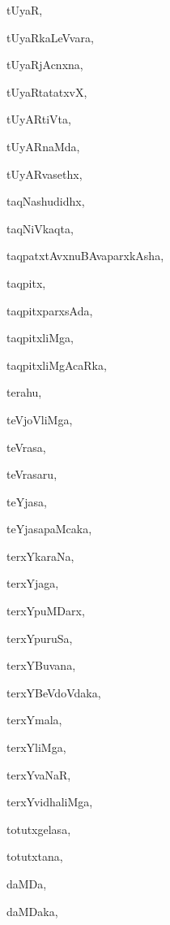 \begin{multicols}{2}
{tUyaR}, \pageref{tUyaR}

{tUyaRkaLeVvara}, \pageref{tUyaRkaLeVvara}

{tUyaRjAcnxna}, \pageref{tUyaRjAcnxna}

{tUyaRtatatxvX}, \pageref{tUyaRtatatxvX}

{tUyARtiVta}, \pageref{tUyARtiVta}

{tUyARnaMda}, \pageref{tUyARnaMda}

{tUyARvasethx}, \pageref{tUyARvasethx}

{taqNashudidhx}, \pageref{taqNashudidhx}

{taqNiVkaqta}, \pageref{taqNiVkaqta}

{taqpatxtAvxnuBAvaparxkAsha}, \pageref{taqpatxtAvxnuBAvaparxkAsha}

{taqpitx}, \pageref{taqpitx}

{taqpitxparxsAda}, \pageref{taqpitxparxsAda}

{taqpitxliMga}, \pageref{taqpitxliMga}

{taqpitxliMgAcaRka}, \pageref{taqpitxliMgAcaRka}

{terahu}, \pageref{terahu}

{teVjoVliMga}, \pageref{teVjoVliMga}

{teVrasa}, \pageref{teVrasa}

{teVrasaru}, \pageref{teVrasaru}

{teYjasa}, \pageref{teYjasa}

{teYjasapaMcaka}, \pageref{teYjasapaMcaka}

{terxYkaraNa}, \pageref{terxYkaraNa}

{terxYjaga}, \pageref{terxYjaga}

{terxYpuMDarx}, \pageref{terxYpuMDarx}

{terxYpuruSa}, \pageref{terxYpuruSa}

{terxYBuvana}, \pageref{terxYBuvana}

{terxYBeVdoVdaka}, \pageref{terxYBeVdoVdaka}

{terxYmala}, \pageref{terxYmala}

{terxYliMga}, \pageref{terxYliMga2}

{terxYvaNaR}, \pageref{terxYvaNaR}

{terxYvidhaliMga}, \pageref{terxYvidhaliMga}

{totutxgelasa}, \pageref{totutxgelasa}

{totutxtana}, \pageref{totutxtana}

{daMDa}, \pageref{daMDa}

{daMDaka}, \pageref{daMDaka}


\end{multicols}
